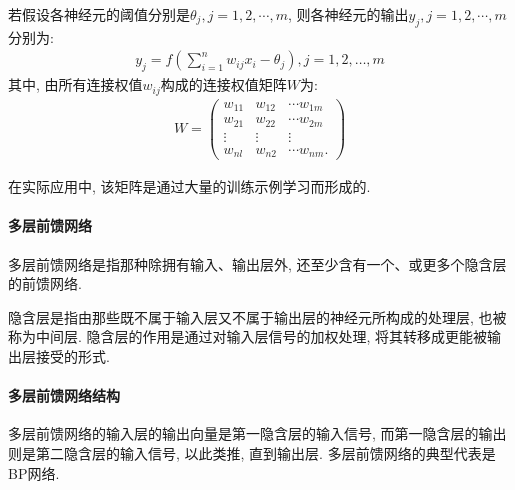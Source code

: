 若假设各神经元的阈值分别是$\theta_j, j=1,2,\cdots,m$, 则各神经元的输出$y_j, j=1,2, \cdots, m$分别为:
\begin{align}
    {y}_{{j}}={f}\left(\sum_{{i}=1}^{{n}} w_{{ij}} {x}_{{i}}-\theta_{{j}}\right), {j}=1,2, \ldots, {m}
\end{align}
其中, 由所有连接权值$w_{ij}$构成的连接权值矩阵$W$为:
\begin{align}
    W=\left(
  \begin{array}{lll}
  {w_{11}} & {w_{12}} & {\cdots w_{1 {m}}} \\ {w_{21}} & {w_{22}} & {\cdots w_{2 {m}}} \\
  {\vdots} & {\vdots} & {\vdots} \\ {w_{{nl}}} & {w_{{n} 2}} & {\cdots w_{{nm}}}.
  \end{array}
  \right)
\end{align}

在实际应用中, 该矩阵是通过大量的训练示例学习而形成的.
\paragraph{多层前馈网络}
多层前馈网络是指那种除拥有输入、输出层外, 还至少含有一个、或更多个隐含层的前馈网络.

隐含层是指由那些既不属于输入层又不属于输出层的神经元所构成的处理层, 也被称为中间层. 隐含层的作用是通过对输入层信号的加权处理, 将其转移成更能被输出层接受的形式.
\paragraph{多层前馈网络结构}

多层前馈网络的输入层的输出向量是第一隐含层的输入信号, 而第一隐含层的输出则是第二隐含层的输入信号, 以此类推, 直到输出层. 多层前馈网络的典型代表是BP网络.
